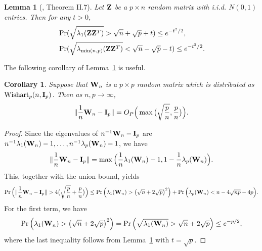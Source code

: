 \documentclass[3p]{elsarticle}
\theoremstyle{plain}
\newtheorem{corollary}{\quad\quad Corollary}
\newtheorem{lemma}{\quad\quad Lemma}
\theoremstyle{definition}
\theoremstyle{remark}
\begin{document}
\begin{appendices}
\begin{lemma}[\cite{DAVIDSON2001317}, Theorem II.7]\label{DSbound}
    Let $\mathbf{Z}$ be a $p\times n$ random matrix with i.i.d. $N(0,1)$ entries.
    Then for any $t>0$,
    \begin{align*}
        &\Pr(\sqrt{\lambda_1(\mathbf{Z} \mathbf{Z}^T )}>\sqrt{n}+\sqrt{p}+t)\leq e^{-t^2/2},
        \\
        &\Pr(\sqrt{\lambda_{\min(n,p)}(\mathbf{Z} \mathbf{Z}^T )}<\sqrt{n}-\sqrt{p}-t)\leq e^{-t^2/2}.
    \end{align*}
\end{lemma}
    The following corollary of Lemma~\ref{DSbound} is useful.

\begin{corollary}\label{corNorm}
Suppose that $\mathbf{W}_n$ is a $p \times p$ random matrix which is distributed as $\mathrm{Wishart}_p(n,\mathbf{I}_{p})$.
    Then as $n,p\to \infty$,
$$
    \|\frac{1}{n}\mathbf{W}_n-\mathbf{I}_p\|=O_P\Big(\max\big(\sqrt{\frac{p}{n}},\frac{p}{n}\big)\Big).
$$
\end{corollary}
\begin{proof}
    Since the eigenvalues of $n^{-1}\mathbf{W}_n-\mathbf{I}_p$ are $n^{-1}\lambda_1(\mathbf{W}_n)-1,\ldots, n^{-1}\lambda_p(\mathbf{W}_n)-1$, we have
     $$\|\frac{1}{n}\mathbf{W}_n-\mathbf{I}_p\|=\max\Big(\frac{1}{n}\lambda_1(\mathbf{W}_n)-1,1-\frac{1}{n}\lambda_p(\mathbf{W}_n)\Big).$$
This, together with the union bound, yields
$$
    \Pr\Big(\|\frac{1}{n}\BW_n-\BI_p\|>4\big(\sqrt{\frac{p}{n}}+\frac{p}{n}\big)\Big)
    \leq
    \Pr\Big(\lambda_1(\BW_n)>\big(\sqrt{n}+2\sqrt{p}\big)^2\Big)+
    \Pr\Big(\lambda_p(\BW_n)<n-4\sqrt{np}-4p\Big).
$$
    For the first term, we have    $$
    \Pr\Big(\lambda_1(\mathbf{W}_n)>\big(\sqrt{n}+2\sqrt{p}\big)^2\Big)=
    \Pr\Big(\sqrt{\lambda_1(\mathbf{W}_n)}>\sqrt{n}+2\sqrt{p}\Big)\leq e^{-p/2},
    $$
 where the last inequality follows from Lemma~\ref{DSbound} with $t=\sqrt{p}$.


\end{proof}
\end{appendices}
\end{document}
